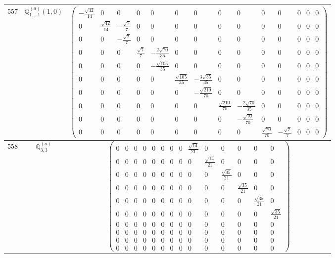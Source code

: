 \documentclass[fleqn,8pt,landscape]{jsarticle}
\begin{document}
\begin{center}
\begin{longtable}{ccc}
$ 557 $ & $ \mathbb{Q}_{1,-1}^{(a)}(1,0) $ & $ \begin{pmatrix} - \frac{\sqrt{42}}{14} & 0 & 0 & 0 & 0 & 0 & 0 & 0 & 0 & 0 & 0 & 0 & 0 & 0 \\ 0 & \frac{\sqrt{42}}{14} & - \frac{\sqrt{7}}{7} & 0 & 0 & 0 & 0 & 0 & 0 & 0 & 0 & 0 & 0 & 0 \\ 0 & 0 & - \frac{\sqrt{7}}{7} & 0 & 0 & 0 & 0 & 0 & 0 & 0 & 0 & 0 & 0 & 0 \\ 0 & 0 & 0 & \frac{\sqrt{7}}{7} & - \frac{2 \sqrt{70}}{35} & 0 & 0 & 0 & 0 & 0 & 0 & 0 & 0 & 0 \\ 0 & 0 & 0 & 0 & - \frac{\sqrt{105}}{35} & 0 & 0 & 0 & 0 & 0 & 0 & 0 & 0 & 0 \\ 0 & 0 & 0 & 0 & 0 & \frac{\sqrt{105}}{35} & - \frac{3 \sqrt{35}}{35} & 0 & 0 & 0 & 0 & 0 & 0 & 0 \\ 0 & 0 & 0 & 0 & 0 & 0 & - \frac{\sqrt{210}}{70} & 0 & 0 & 0 & 0 & 0 & 0 & 0 \\ 0 & 0 & 0 & 0 & 0 & 0 & 0 & \frac{\sqrt{210}}{70} & - \frac{2 \sqrt{70}}{35} & 0 & 0 & 0 & 0 & 0 \\ 0 & 0 & 0 & 0 & 0 & 0 & 0 & 0 & - \frac{\sqrt{70}}{70} & 0 & 0 & 0 & 0 & 0 \\ 0 & 0 & 0 & 0 & 0 & 0 & 0 & 0 & 0 & \frac{\sqrt{70}}{70} & - \frac{\sqrt{7}}{7} & 0 & 0 & 0 \end{pmatrix} $ \\ \hline
$ 558 $ & $ \mathbb{Q}_{3,3}^{(a)} $ & $ \begin{pmatrix} 0 & 0 & 0 & 0 & 0 & 0 & 0 & 0 & \frac{\sqrt{14}}{21} & 0 & 0 & 0 & 0 & 0 \\ 0 & 0 & 0 & 0 & 0 & 0 & 0 & 0 & 0 & \frac{\sqrt{14}}{21} & 0 & 0 & 0 & 0 \\ 0 & 0 & 0 & 0 & 0 & 0 & 0 & 0 & 0 & 0 & \frac{\sqrt{35}}{21} & 0 & 0 & 0 \\ 0 & 0 & 0 & 0 & 0 & 0 & 0 & 0 & 0 & 0 & 0 & \frac{\sqrt{35}}{21} & 0 & 0 \\ 0 & 0 & 0 & 0 & 0 & 0 & 0 & 0 & 0 & 0 & 0 & 0 & \frac{\sqrt{35}}{21} & 0 \\ 0 & 0 & 0 & 0 & 0 & 0 & 0 & 0 & 0 & 0 & 0 & 0 & 0 & \frac{\sqrt{35}}{21} \\ 0 & 0 & 0 & 0 & 0 & 0 & 0 & 0 & 0 & 0 & 0 & 0 & 0 & 0 \\ 0 & 0 & 0 & 0 & 0 & 0 & 0 & 0 & 0 & 0 & 0 & 0 & 0 & 0 \\ 0 & 0 & 0 & 0 & 0 & 0 & 0 & 0 & 0 & 0 & 0 & 0 & 0 & 0 \\ 0 & 0 & 0 & 0 & 0 & 0 & 0 & 0 & 0 & 0 & 0 & 0 & 0 & 0 \end{pmatrix} $ \\ \hline

\end{longtable}
\end{center}
\end{document}
